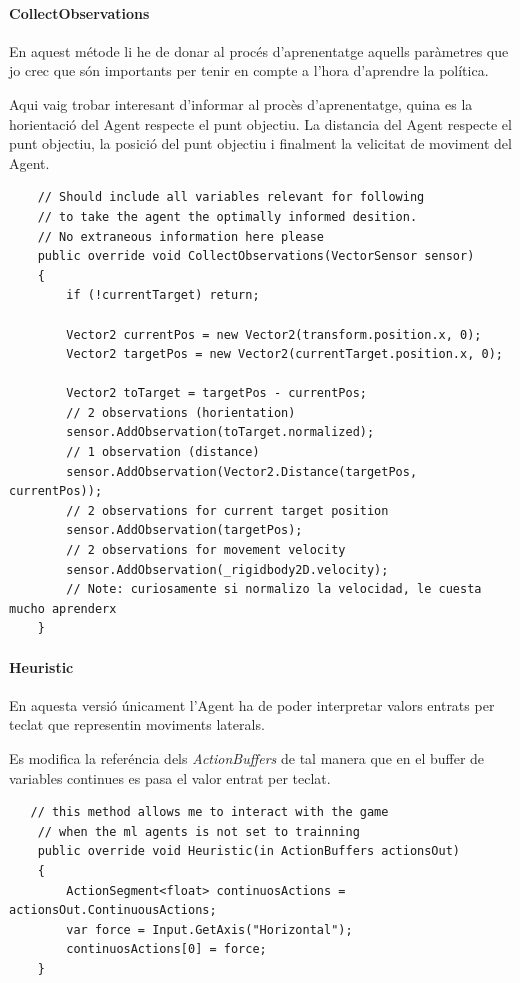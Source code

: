 \documentclass{article}
\begin{document}
    \paragraph{CollectObservations}
    
    En aquest métode li he de donar al procés d'aprenentatge aquells paràmetres que jo crec que són importants per tenir en compte a l'hora d'aprendre la política.
    
    Aqui vaig trobar interesant d'informar al procès d'aprenentatge, quina es la horientació del Agent respecte el punt objectiu. La distancia del Agent respecte el punt objectiu, la posició del punt objectiu i finalment la velicitat de moviment del Agent. 
    
    \begin{lstlisting}
    // Should include all variables relevant for following 
    // to take the agent the optimally informed desition.
    // No extraneous information here please
    public override void CollectObservations(VectorSensor sensor)
    {
        if (!currentTarget) return;

        Vector2 currentPos = new Vector2(transform.position.x, 0);
        Vector2 targetPos = new Vector2(currentTarget.position.x, 0);

        Vector2 toTarget = targetPos - currentPos;
        // 2 observations (horientation)
        sensor.AddObservation(toTarget.normalized);
        // 1 observation (distance)
        sensor.AddObservation(Vector2.Distance(targetPos, currentPos));
        // 2 observations for current target position
        sensor.AddObservation(targetPos);
        // 2 observations for movement velocity
        sensor.AddObservation(_rigidbody2D.velocity);
        // Note: curiosamente si normalizo la velocidad, le cuesta mucho aprenderx
    }
    \end{lstlisting}
   
   \newpage
   
   \paragraph{Heuristic}
   En aquesta versió únicament l'Agent ha de poder interpretar valors entrats per teclat que representin moviments laterals.
   
   Es modifica la referéncia dels \textit{ActionBuffers} de tal manera que en el buffer de variables continues es pasa el valor entrat per teclat. \\
   
   \begin{lstlisting}
   // this method allows me to interact with the game
    // when the ml agents is not set to trainning
    public override void Heuristic(in ActionBuffers actionsOut)
    {
        ActionSegment<float> continuosActions = actionsOut.ContinuousActions;
        var force = Input.GetAxis("Horizontal");
        continuosActions[0] = force;
    }
   \end{lstlisting}
   
\end{document}
